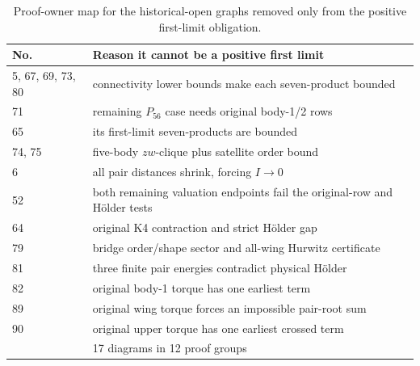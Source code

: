\documentclass[11pt]{amsart}
\theoremstyle{remark}
\begin{document}
\begin{table}[ht]

\centering\small

\begin{tabular}{p{2.0cm}p{12.0cm}}

\hline

No. & Reason it cannot be a positive first limit \\

\hline

5, 67, 69, 73, 80 & connectivity lower bounds make each seven-product bounded \\
71 & remaining $P_{56}$ case needs original body-1/2 rows \\

65 & its first-limit seven-products are bounded \\

74, 75 & five-body $zw$-clique plus satellite order bound \\

6 & all pair distances shrink, forcing $I\to0$ \\

52 & both remaining valuation endpoints fail the original-row and H\"older tests \\
64 & original K4 contraction and strict H\"older gap \\

79 & bridge order/shape sector and all-wing Hurwitz certificate \\
81 & three finite pair energies contradict physical H\"older \\

82 & original body-1 torque has one earliest term \\

89 & original wing torque forces an impossible pair-root sum \\

90 & original upper torque has one earliest crossed term \\

\hline

& 17 diagrams in 12 proof groups \\

\hline

\end{tabular}

\caption{Proof-owner map for the historical-open graphs removed only
from the positive first-limit obligation.}
\label{tab:open-exclusions}

\end{table}
\end{document}

